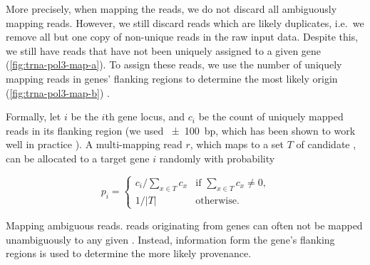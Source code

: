 More precisely, when mapping the reads, we do not discard all ambiguously
mapping reads. However, we still discard reads which are likely \pcr duplicates,
i.e.\ we remove all but one copy of non-unique reads in the raw input data.
Despite this, we still have reads that have not been uniquely assigned to a
given \trna gene (\cref{fig:trna-pol3-map-a}). To assign these reads, we use the
number of uniquely mapping reads in \trna genes’ flanking regions to determine
the most likely origin (\cref{fig:trna-pol3-map-b}) \citep{Kutter:2011}.

Formally, let \(i\) be the \(i\)th \trna gene locus, and \(c_i\) be the count of
uniquely mapped reads in its flanking region (we used \SI{\pm100}{bp}, which has
been shown to work well in practice \citep{Kutter:2011}). A multi-mapping read
\(r\), which maps to a set \(T\) of candidate \trna[s], can be allocated to a
target \trna gene \(i\) randomly with probability

\begin{equation}
    p_i = \begin{cases}
        c_i \big/ \sum_{x \in T}c_x &
            \text{if \(\sum_{x \in T}c_x \neq 0\),} \\
        1 \big/ \vert T \rvert & \text{otherwise.}
    \end{cases}
\end{equation}

    {Mapping ambiguous  reads.}
    {\chip reads originating from \trna genes can often not be mapped
    unambiguously to any given \trna. Instead, information form the gene’s
    flanking regions is used to determine the more likely provenance.}

